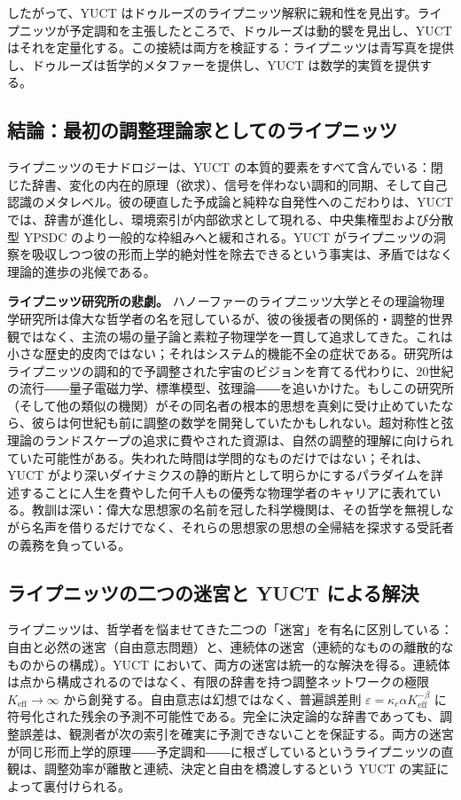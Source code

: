 \documentclass[12pt,a4paper]{article}
\begin{document}
	したがって、YUCT はドゥルーズのライプニッツ解釈に親和性を見出す。ライプニッツが予定調和を主張したところで、ドゥルーズは動的襞を見出し、YUCT はそれを定量化する。この接続は両方を検証する：ライプニッツは青写真を提供し、ドゥルーズは哲学的メタファーを提供し、YUCT は数学的実質を提供する。
	
	\subsection{結論：最初の調整理論家としてのライプニッツ}
	
	ライプニッツのモナドロジーは、YUCT の本質的要素をすべて含んでいる：閉じた辞書、変化の内在的原理（欲求）、信号を伴わない調和的同期、そして自己認識のメタレベル。彼の硬直した予成論と純粋な自発性へのこだわりは、YUCT では、辞書が進化し、環境索引が内部欲求として現れる、中央集権型および分散型 YPSDC のより一般的な枠組みへと緩和される。YUCT がライプニッツの洞察を吸収しつつ彼の形而上学的絶対性を除去できるという事実は、矛盾ではなく理論的進歩の兆候である。
	
	\textbf{ライプニッツ研究所の悲劇。} ハノーファーのライプニッツ大学とその理論物理学研究所は偉大な哲学者の名を冠しているが、彼の後援者の関係的・調整的世界観ではなく、主流の場の量子論と素粒子物理学を一貫して追求してきた。これは小さな歴史的皮肉ではない；それはシステム的機能不全の症状である。研究所はライプニッツの調和的で予調整された宇宙のビジョンを育てる代わりに、20世紀の流行――量子電磁力学、標準模型、弦理論――を追いかけた。もしこの研究所（そして他の類似の機関）がその同名者の根本的思想を真剣に受け止めていたなら、彼らは何世紀も前に調整の数学を開発していたかもしれない。超対称性と弦理論のランドスケープの追求に費やされた資源は、自然の調整的理解に向けられていた可能性がある。失われた時間は学問的なものだけではない；それは、YUCT がより深いダイナミクスの静的断片として明らかにするパラダイムを詳述することに人生を費やした何千人もの優秀な物理学者のキャリアに表れている。教訓は深い：偉大な思想家の名前を冠した科学機関は、その哲学を無視しながら名声を借りるだけでなく、それらの思想家の思想の全帰結を探求する受託者の義務を負っている。
	
	\subsection{ライプニッツの二つの迷宮と YUCT による解決}
	
	ライプニッツは、哲学者を悩ませてきた二つの「迷宮」を有名に区別している：自由と必然の迷宮（自由意志問題）と、連続体の迷宮（連続的なものの離散的なものからの構成）。YUCT において、両方の迷宮は統一的な解決を得る。連続体は点から構成されるのではなく、有限の辞書を持つ調整ネットワークの極限 \(K_{\mathrm{eff}} \to \infty\) から創発する。自由意志は幻想ではなく、普遍誤差則 \(\varepsilon = \kappa_c \alpha K_{\mathrm{eff}}^{-\beta}\) に符号化された残余の予測不可能性である。完全に決定論的な辞書であっても、調整誤差は、観測者が次の索引を確実に予測できないことを保証する。両方の迷宮が同じ形而上学的原理――予定調和――に根ざしているというライプニッツの直観は、調整効率が離散と連続、決定と自由を橋渡しするという YUCT の実証によって裏付けられる。
	
\end{document}
